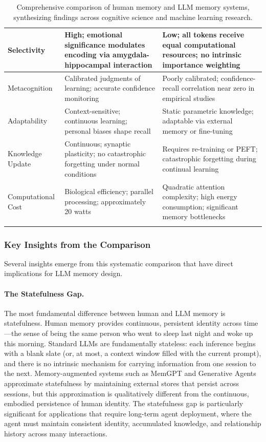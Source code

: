\documentclass[11pt,letterpaper]{article}
\begin{document}
\begin{longtable}{p{3.5cm}p{4.5cm}p{5cm}}
\midrule
Selectivity & High; emotional significance modulates encoding via amygdala-hippocampal interaction & Low; all tokens receive equal computational resources; no intrinsic importance weighting \\
\midrule
Metacognition & Calibrated judgments of learning; accurate confidence monitoring & Poorly calibrated; confidence-recall correlation near zero in empirical studies \\
\midrule
Adaptability & Context-sensitive; continuous learning; personal biases shape recall & Static parametric knowledge; adaptable via external memory or fine-tuning \\
\midrule
Knowledge Update & Continuous; synaptic plasticity; no catastrophic forgetting under normal conditions & Requires re-training or PEFT; catastrophic forgetting during continual learning \\
\midrule
Computational Cost & Biological efficiency; parallel processing; approximately 20 watts & Quadratic attention complexity; high energy consumption; significant memory bottlenecks \\
\bottomrule
\caption{Comprehensive comparison of human memory and LLM memory systems, synthesizing findings across cognitive science and machine learning research.}
\label{tab:human_llm_memory}
\end{longtable}

\subsubsection{Key Insights from the Comparison}

Several insights emerge from this systematic comparison that have direct implications for LLM memory design.

\paragraph{The Statefulness Gap.} The most fundamental difference between human and LLM memory is statefulness. Human memory provides continuous, persistent identity across time---the sense of being the same person who went to sleep last night and woke up this morning. Standard LLMs are fundamentally stateless: each inference begins with a blank slate (or, at most, a context window filled with the current prompt), and there is no intrinsic mechanism for carrying information from one session to the next. Memory-augmented systems such as MemGPT and Generative Agents approximate statefulness by maintaining external stores that persist across sessions, but this approximation is qualitatively different from the continuous, embodied persistence of human identity. The statefulness gap is particularly significant for applications that require long-term agent deployment, where the agent must maintain consistent identity, accumulated knowledge, and relationship history across many interactions.
\end{document}
